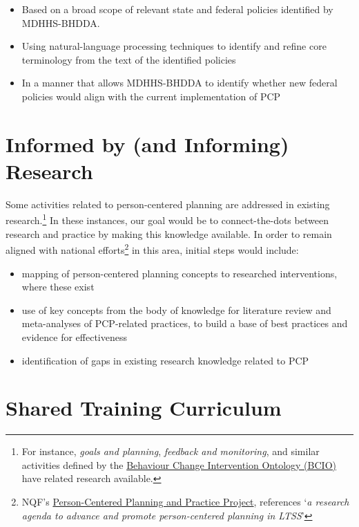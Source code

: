 \documentclass[
]{book}
\providecommand{\tightlist}{%
  \setlength{\itemsep}{0pt}\setlength{\parskip}{0pt}}
\begin{document}
\begin{itemize}
\tightlist
\item
  Based on a broad scope of relevant state and federal policies identified by MDHHS-BHDDA.
\item
  Using natural-language processing techniques to identify and refine core terminology from the text of the identified policies
\item
  In a manner that allows MDHHS-BHDDA to identify whether new federal policies would align with the current implementation of PCP
\end{itemize}

\hypertarget{research}{%
\chapter{Informed by (and Informing) Research}\label{research}}

Some activities related to person-centered planning are addressed in existing research.\footnote{For instance, \emph{goals and planning}, \emph{feedback and monitoring}, and similar activities defined by the \href{https://www.humanbehaviourchange.org/resources/behavioural-science/25/description}{Behaviour Change Intervention Ontology (BCIO)} have related research available.} In these instances, our goal would be to connect-the-dots between research and practice by making this knowledge available. In order to remain aligned with national efforts\footnote{NQF's \href{http://www.qualityforum.org/WorkArea/linkit.aspx?LinkIdentifier=id\&ItemID=91382}{Person-Centered Planning and Practice Project}, references `\emph{a research agenda to advance and promote person-centered planning in LTSS}'} in this area, initial steps would include:

\begin{itemize}
\tightlist
\item
  mapping of person-centered planning concepts to researched interventions, where these exist
\item
  use of key concepts from the body of knowledge for literature review and meta-analyses of PCP-related practices, to build a base of best practices and evidence for effectiveness
\item
  identification of gaps in existing research knowledge related to PCP
\end{itemize}

\hypertarget{curriculum}{%
\chapter{Shared Training Curriculum}\label{curriculum}}
\end{document}
